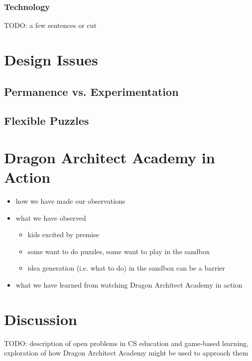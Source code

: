 \documentclass{sig-alternate}
\newcommand{\TODO}[1]{{\color{red} TODO: #1}}
\newcommand{\gametitle}{{\color{RoyalPurple} Dragon Architect Academy}}
\begin{document}
\subsubsection{Technology}
\TODO{a few sentences or cut}

\section{Design Issues}


\subsection{Permanence vs. Experimentation}

\subsection{Flexible Puzzles}


\section{\gametitle{} in Action}
\begin{itemize}
\item how we have made our observations
\item what we have observed
\begin{itemize}
\item kids excited by premise
\item some want to do puzzles, some want to play in the sandbox
\item idea generation (i.e. what to do) in the sandbox can be a barrier
\end{itemize}

\item what we have learned from watching \gametitle{} in action
\end{itemize}


\section{Discussion}
\TODO{description of open problems in CS education and game-based learning, exploration of how \gametitle{} might be used to approach them}



 
\end{document}
